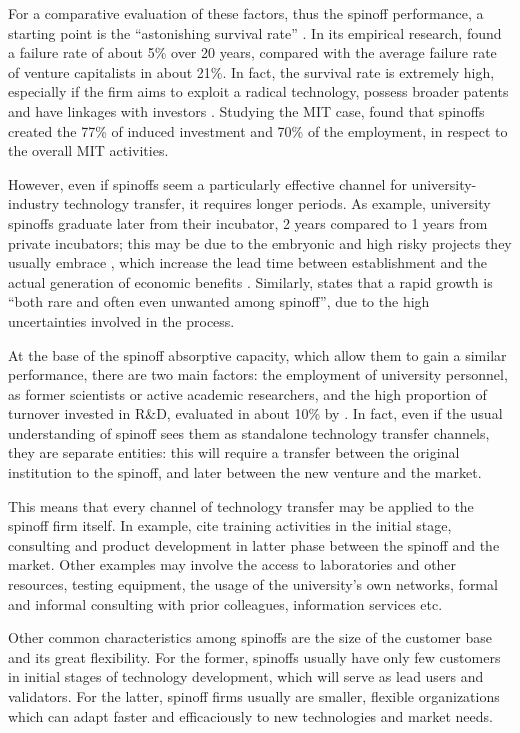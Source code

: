 For a comparative evaluation of these factors, thus the spinoff performance, a starting point is the \enquote{astonishing survival rate} \citep{Balderi2007}. In its empirical research, \citet{Leitch2005} found a failure rate of about 5\% over 20 years, compared with the average failure rate of venture capitalists in about 21\%. In fact, the survival rate is extremely high, especially if the firm aims to exploit a radical technology, possess broader patents and have linkages with investors \citep{OShea2004}. Studying the MIT case, \citet{Rogers2001} found that spinoffs created the 77\% of induced investment and 70\% of the employment, in respect to the overall MIT activities.

However, even if spinoffs seem a particularly effective channel for university- industry technology transfer, it requires longer periods. As example, university spinoffs graduate later from their incubator, 2 years compared to 1 years from private incubators; this may be due to the embryonic and high risky projects they usually embrace \citep{Rothaermel2005}, which increase the lead time between establishment and the actual generation of economic benefits \citep{Leitch2005}. Similarly, \citet{Perez2003} states that a rapid growth is \enquote{both rare and often even unwanted among spinoff}, due to the high uncertainties involved in the process.

At the base of the spinoff absorptive capacity, which allow them to gain a similar performance, there are two main factors: the employment of university personnel, as former scientists or active academic researchers, and the high proportion of turnover invested in R\&D, evaluated in about 10\% by \citet{Perez2003}. In fact, even if the usual understanding of spinoff sees them as standalone technology transfer channels, they are separate entities: this will require a transfer between the original institution to the spinoff, and later between the new venture and the market. 

This means that every channel of technology transfer may be applied to the spinoff firm itself. In example, \citet{Perez2003} cite training activities in the initial stage, consulting and product development in latter phase between the spinoff and the market. Other examples may involve the access to laboratories and other resources, testing equipment, the usage of the university's own networks, formal and informal consulting with prior colleagues, information services etc.

Other common characteristics among spinoffs are the size of the customer base and its great flexibility. For the former, spinoffs usually have only few customers in initial stages of technology development, which will serve as lead users and validators. For the latter, spinoff firms usually are smaller, flexible organizations which can adapt faster and efficaciously to new technologies and market needs. 

